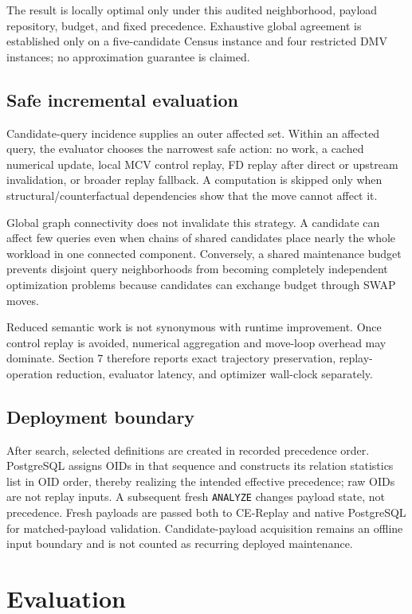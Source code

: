 \documentclass[sigconf,nonacm]{acmart}
\begin{document}
The result is locally optimal only under this audited neighborhood, payload repository, budget, and fixed precedence. Exhaustive global agreement is established only on a five-candidate Census instance and four restricted DMV instances; no approximation guarantee is claimed.

\subsection{Safe incremental evaluation}

Candidate-query incidence supplies an outer affected set. Within an affected query, the evaluator chooses the narrowest safe action: no work, a cached numerical update, local MCV control replay, FD replay after direct or upstream invalidation, or broader replay fallback. A computation is skipped only when structural/counterfactual dependencies show that the move cannot affect it.

Global graph connectivity does not invalidate this strategy. A candidate can affect few queries even when chains of shared candidates place nearly the whole workload in one connected component. Conversely, a shared maintenance budget prevents disjoint query neighborhoods from becoming completely independent optimization problems because candidates can exchange budget through SWAP moves.

Reduced semantic work is not synonymous with runtime improvement. Once control replay is avoided, numerical aggregation and move-loop overhead may dominate. Section 7 therefore reports exact trajectory preservation, replay-operation reduction, evaluator latency, and optimizer wall-clock separately.

\subsection{Deployment boundary}

After search, selected definitions are created in recorded precedence order. PostgreSQL assigns OIDs in that sequence and constructs its relation statistics list in OID order, thereby realizing the intended effective precedence; raw OIDs are not replay inputs. A subsequent fresh \texttt{ANALYZE} changes payload state, not precedence. Fresh payloads are passed both to CE-Replay and native PostgreSQL for matched-payload validation. Candidate-payload acquisition remains an offline input boundary and is not counted as recurring deployed maintenance.

\section{Evaluation}\label{sec:7}
\end{document}
